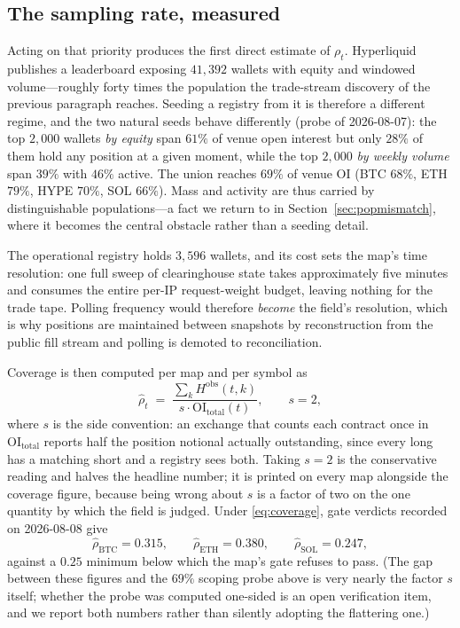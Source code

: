 \documentclass[11pt,a4paper]{article}
\theoremstyle{definition}
\theoremstyle{plain}
\begin{document}
\subsection{The sampling rate, measured}
\label{sec:rho_measured}

Acting on that priority produces the first direct estimate of $\rho_t$. Hyperliquid publishes a
leaderboard exposing $41{,}392$ wallets with equity and windowed volume---roughly forty times the
population the trade-stream discovery of the previous paragraph reaches. Seeding a registry from it
is therefore a different regime, and the two natural seeds behave differently (probe of
2026-08-07): the top $2{,}000$ wallets \emph{by equity} span $61\%$ of venue open interest but only
$28\%$ of them hold any position at a given moment, while the top $2{,}000$ \emph{by weekly volume}
span $39\%$ with $46\%$ active. The union reaches $69\%$ of venue OI (BTC $68\%$, ETH $79\%$, HYPE
$70\%$, SOL $66\%$). Mass and activity are thus carried by distinguishable populations---a fact we
return to in Section~\ref{sec:popmismatch}, where it becomes the central obstacle rather than a
seeding detail.

The operational registry holds $3{,}596$ wallets, and its cost sets the map's time resolution: one
full sweep of clearinghouse state takes approximately five minutes and consumes the entire per-IP
request-weight budget, leaving nothing for the trade tape. Polling frequency would therefore
\emph{become} the field's resolution, which is why positions are maintained between snapshots by
reconstruction from the public fill stream and polling is demoted to reconciliation.

Coverage is then computed per map and per symbol as
\begin{equation}
  \widehat{\rho}_t \;=\; \frac{\sum_k H^{\text{obs}}(t,k)}{s \cdot \mathrm{OI}_{\text{total}}(t)},
  \qquad s = 2,
  \label{eq:coverage}
\end{equation}
where $s$ is the side convention: an exchange that counts each contract once in
$\mathrm{OI}_{\text{total}}$ reports half the position notional actually outstanding, since every
long has a matching short and a registry sees both. Taking $s=2$ is the conservative reading and
halves the headline number; it is printed on every map alongside the coverage figure, because being
wrong about $s$ is a factor of two on the one quantity by which the field is judged. Under
\eqref{eq:coverage}, gate verdicts recorded on 2026-08-08 give
\[
  \widehat{\rho}_{\text{BTC}} = 0.315,\qquad
  \widehat{\rho}_{\text{ETH}} = 0.380,\qquad
  \widehat{\rho}_{\text{SOL}} = 0.247,
\]
against a $0.25$ minimum below which the map's gate refuses to pass. (The gap between these figures
and the $69\%$ scoping probe above is very nearly the factor $s$ itself; whether the probe was
computed one-sided is an open verification item, and we report both numbers rather than silently
adopting the flattering one.)
\end{document}
